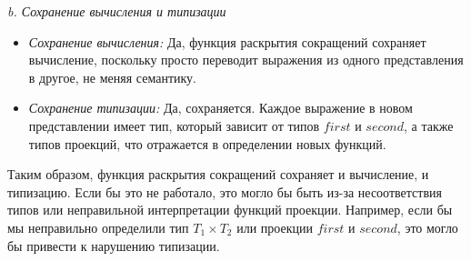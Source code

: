 \documentclass[landscape, 11pt]{report}
\begin{document}
	\textit{b. Сохранение вычисления и типизации}

	\begin{itemize}
	\item \textit{Сохранение вычисления:} Да, функция раскрытия сокращений сохраняет вычисление, поскольку просто переводит выражения из одного представления в другое, не меняя семантику.
	
	\item \textit{Сохранение типизации:} Да, сохраняется. Каждое выражение в новом представлении имеет тип, который зависит от типов $first$ и $second$, а также типов проекций, что отражается в определении новых функций.
	\end{itemize}

	\hspace{0.8cm} Таким образом, функция раскрытия сокращений сохраняет и вычисление, и типизацию. Если бы это не работало, это могло бы быть из-за несоответствия типов или неправильной интерпретации функций проекции. Например, если бы мы неправильно определили тип $T_1 \times T_2$ или проекции $first$ и $second$, это могло бы привести к нарушению типизации.
\end{document}
